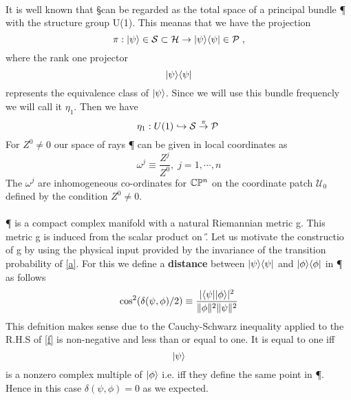  \paragraph{} 
It is well known that \S \;can be regarded as the total space of a principal bundle \P\; with the structure group U(1). This meanas
that we have the projection 
\begin{equation}\label{c}
 \pi: \psiket \in \S \subset \H \to \psiket \psibra \in \P\;,
\end{equation}
where the rank one projector $$\psiket \psibra$$ represents the equivalence class of $\psiket$. Since we will use this 
bundle frequencly we will call it $\eta_1$.
Then we have 
\begin{equation}\label{d}
 \eta_1 : U(1) \hookrightarrow \S \stackrel{\pi}{\to} \P\;
\end{equation}
For $Z^{0} \neq 0$ our space of rays \P\; can be given in local coordinates as 
\begin{equation}\label{e}
 \omega^{j} \equiv \dfrac{Z^{j}}{Z^{0}}, \;j=1,\cdots,n
\end{equation}
The $\omega^{j}$ are inhomogeneous co-ordinates for $\Cbb\Pbb^{n}$ on the coordinate patch $\mathcal{U}_{0}$
defined by the condition $Z^{0} \neq 0$.
\paragraph{}
 \P\; is a compact complex manifold with a natural Riemannian metric g. This metric g is induced from the scalar 
product on \H. Let us motivate the constructio of g by using the physical input provided by the invariance of the transition
probability of \ref{a}. For this we define a \textbf{distance} between $\psiket \psibra$ and $\phiket \phibra$ in 
\P\; as follows 
\begin{equation}\label{f}
 \cos^{2}(\delta (\psi, \phi)/2) \equiv \dfrac{|\psibra \phiket|^2}{\|\phi\|^{2} \|\psi\|^2}
\end{equation}
This defnition makes sense due to the Cauchy-Schwarz inequality applied to the R.H.S of \ref{f} is non-negative and less than
or equal to one. It is equal to one iff $$\psiket$$ is a nonzero complex multiple of $\phiket$ i.e. iff they define
the same point in \P\;. Hence in this case $\delta(\psi, \phi) = 0$ as we expected. 
